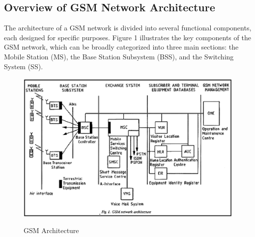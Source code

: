 \documentclass[conference]{IEEEtran}
\begin{document}
\subsection{Overview of GSM Network Architecture}
The architecture of a GSM network is divided into several functional components, each designed for specific purposes. Figure 1 illustrates the key components of the GSM network, which can be broadly categorized into three main sections: the Mobile Station (MS), the Base Station Subsystem (BSS), and the Switching System (SS). \cite{kaur2012review}

\begin{figure}
    \centering
    \includegraphics[width=0.5\linewidth]{Assets/GSM-Architecture.png}
    \caption{GSM Architecture} \cite{kaur2012review}
    \label{fig:enter-label}
\end{figure}
\end{document}
